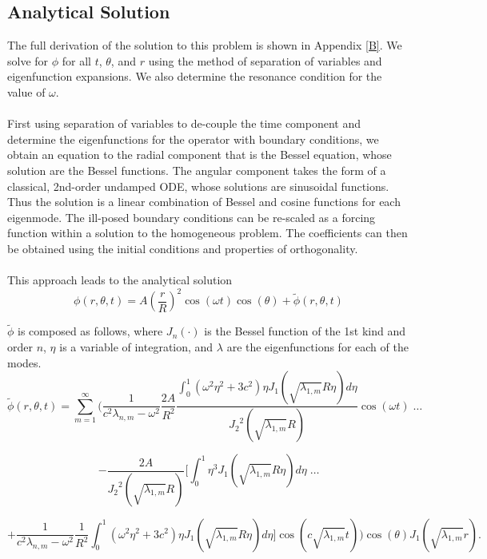\documentclass{homework}
\begin{document}
\subsection{Analytical Solution}
The full derivation of the solution to this problem is shown in Appendix \ref{B}. We solve for $\phi$ for all $t$, $\theta$, and $r$ using the method of separation of variables and eigenfunction expansions. We also determine the resonance condition for the value of $\omega$. 
\\ \\ \noindent
First using separation of variables to de-couple the time component and determine the eigenfunctions for the operator with boundary conditions, we obtain an equation to the radial component that is the Bessel equation, whose solution are the Bessel functions. The angular component takes the form of a classical, 2nd-order undamped ODE, whose solutions are sinusoidal functions. Thus the solution is a linear combination of Bessel and cosine functions for each eigenmode.  The ill-posed boundary conditions can be re-scaled as a forcing function within a solution to the homogeneous problem. The coefficients can then be obtained using the initial conditions and properties of orthogonality.
\\ \\ \noindent
This approach leads to the analytical solution 
$$ \phi(r, \theta, t) = A \left(\frac{r}{R} \right)^2 \cos(\omega t) \cos(\theta) + \tilde{\phi} (r, \theta, t)$$ 

\noindent $\tilde{\phi}$ is composed as follows, where $J_n (\cdot)$ is the Bessel function of the 1st kind and order $n$, $\eta$ is a variable of integration, and $\lambda$ are the eigenfunctions for each of the modes.
$$ \tilde{\phi} (r, \theta, t) = \sum_{m=1}^\infty \Biggl( \frac{1}{c^2 \lambda_{n,m} - \omega^2} \frac{2A}{R^2} \frac{\int_0^1 \left( \omega^2 \eta^2 + 3c^2 \right) \eta J_1\left( \sqrt{\lambda_{1,m}} R \eta \right) d\eta }{{J_2}^2 \left( \sqrt{\lambda_{1,m}} R \right)} \cos(\omega t) \; \dots $$

$$ - \frac{2A}{{J_2}^2 \left( \sqrt{\lambda_{1,m}} R \right)}\Bigg[ \int_0^1 \eta^3 J_1 \left( \sqrt{\lambda_{1,m}} R\eta \right) d\eta \; \dots $$

$$ + \frac{1}{c^2 \lambda_{n,m} - \omega^2} \frac{1}{R^2} \int_0^1 \left(\omega^2 \eta^2 + 3c^2 \right) \eta J_1 \left(\sqrt{\lambda_{1,m}} R \eta \right) d\eta \Bigg] \cos \left(c \sqrt{\lambda_{1,m}} t \right) \Biggl) \cos(\theta) J_1 \left(\sqrt{\lambda_{1,m} } r \right) .$$
\end{document}
